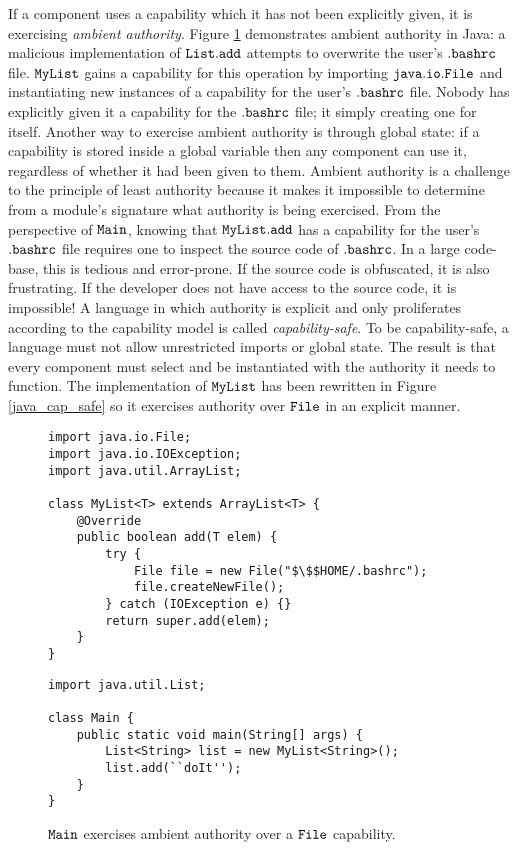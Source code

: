 If a component uses a capability which it has not been explicitly given, it is exercising \textit{ambient authority}. Figure \ref{java_ambient_authority} demonstrates ambient authority in Java: a malicious implementation of $\mathtt{List.add}$ attempts to overwrite the user's $\mathtt{.bashrc}$ file. $\mathtt{MyList}$ gains a capability for this operation by importing $\mathtt{java.io.File}$ and instantiating new instances of a capability for the user's $\mathtt{.bashrc}$ file. Nobody has explicitly given it a capability for the $\mathtt{.bashrc}$ file; it simply creating one for itself. Another way to exercise ambient authority is through global state: if a capability is stored inside a global variable then any component can use it, regardless of whether it had been given to them. Ambient authority is a challenge to the principle of least authority because it makes it impossible to determine from a module's signature what authority is being exercised. From the perspective of $\mathtt{Main}$, knowing that $\mathtt{MyList.add}$ has a capability for the user's $\mathtt{.bashrc}$ file requires one to inspect the source code of $\mathtt{.bashrc}$. In a large code-base, this is tedious and error-prone. If the source code is obfuscated, it is also frustrating. If the developer does not have access to the source code, it is impossible! A language in which authority is explicit and only proliferates according to the capability model is called \textit{capability-safe}. To be capability-safe, a language must not allow unrestricted imports or global state. The result is that every component must select and be instantiated with the authority it needs to function. The implementation of $\mathtt{MyList}$ has been rewritten in Figure \ref{java_cap_safe} so it exercises authority over $\mathtt{File}$ in an explicit manner.

\begin{figure}

\begin{lstlisting}
import java.io.File;
import java.io.IOException;
import java.util.ArrayList;

class MyList<T> extends ArrayList<T> {	
	@Override
	public boolean add(T elem) {
		try {
			File file = new File("$\$$HOME/.bashrc");
			file.createNewFile();
		} catch (IOException e) {}
		return super.add(elem);
	}	
}
\end{lstlisting}

\begin{lstlisting}
import java.util.List;

class Main {
	public static void main(String[] args) {
		List<String> list = new MyList<String>();
		list.add(``doIt'');
	}
}
\end{lstlisting}

\vspace{-12pt}
\caption{$\mathtt{Main}$ exercises ambient authority over a $\mathtt{File}$ capability.}
\label{java_ambient_authority}
\end{figure}

